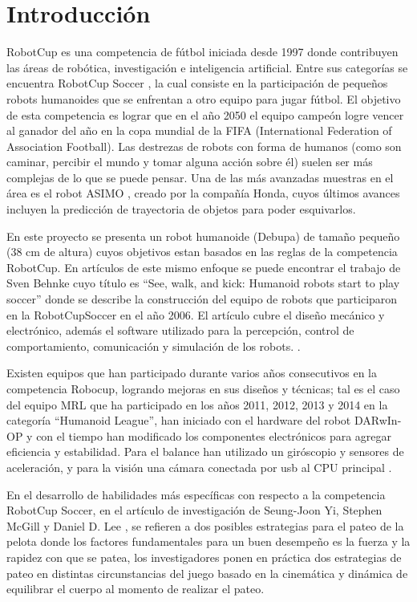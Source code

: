 \chapter{Introducción}\label{intro}


\label{sect:justificacion}
RobotCup \cite{robotcup} es una competencia de fútbol iniciada desde 1997 donde contribuyen las áreas de robótica, investigación e inteligencia artificial. Entre sus categorías se encuentra RobotCup Soccer \cite{robotcupsoccer}, la cual consiste en la participación de pequeños robots humanoides que se enfrentan a otro equipo para jugar fútbol. El objetivo de esta competencia es lograr que en el año 2050 el equipo campeón logre vencer al ganador del año en la copa mundial de la FIFA (International Federation of Association Football). Las destrezas de robots con forma de humanos (como son caminar, percibir el mundo y tomar alguna acción sobre él) suelen ser más complejas de lo que se puede pensar. Una de las más avanzadas muestras en el área es el robot ASIMO \cite{asimo}, creado por la compañía Honda, cuyos últimos avances incluyen la predicción de trayectoria de objetos para poder esquivarlos.

En este proyecto se presenta un robot humanoide (Debupa) de tamaño pequeño (38 cm de altura) cuyos objetivos estan basados en las reglas de la competencia RobotCup. En artículos de este mismo enfoque se puede encontrar el trabajo de Sven Behnke cuyo título es “See, walk, and kick: Humanoid robots start to play soccer” donde se describe la construcción del equipo de robots que participaron en la RobotCupSoccer en el a\~no 2006. El artículo cubre el diseño mecánico y electrónico, además el software utilizado para la percepción, control de comportamiento, comunicación y simulación de los robots. \cite{paper}.

Existen equipos que han participado durante varios años consecutivos en la competencia Robocup, logrando mejoras en sus diseños y técnicas; tal es el caso del equipo MRL que ha participado en los años 2011, 2012, 2013 y 2014 en la categoría “Humanoid League”, han iniciado con el hardware del robot DARwIn-OP y con el tiempo han modificado los componentes electrónicos para agregar eficiencia y estabilidad. Para el balance han utilizado un giróscopio y sensores de aceleración, y para la visión una cámara conectada por usb al CPU principal \cite{paper1}.

En el desarrollo de habilidades más específicas con respecto a la competencia RobotCup Soccer, en el artículo de investigación de Seung-Joon Yi, Stephen McGill y Daniel D. Lee  \cite{paper2}, se refieren a dos posibles estrategias para el pateo de la pelota donde los factores fundamentales para un buen desempeño es la fuerza y la rapidez con que se patea, los investigadores ponen en pr\'actica dos estrategias de pateo en distintas circunstancias del juego basado en la cinemática y dinámica de equilibrar el cuerpo al momento de realizar el pateo.


